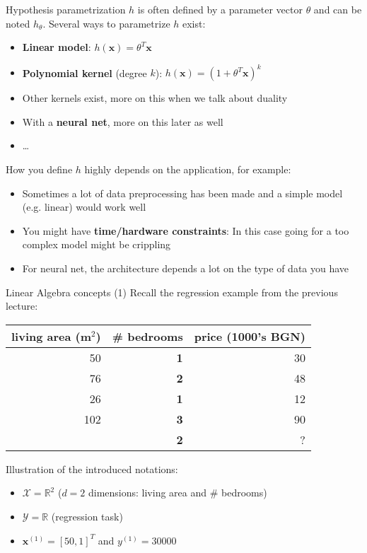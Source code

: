 \documentclass{beamer}
\newcommand{\X}{\mathcal{X}}
\newcommand{\Y}{\mathcal{Y}}
\newcommand{\real}{\mathbb{R}}
\newcommand{\bx}{\bm{x}}
\begin{document}
\begin{frame}{Hypothesis parametrization}
$h$ is often defined by a parameter vector $\theta$ and can be noted $h_\theta$. \pause Several ways to parametrize $h$ exist:
\begin{itemize}
	\item \textbf{Linear model}: $h(\bx) = \theta^T \bx$
	\item \textbf{Polynomial kernel} (degree $k$): $h(\bx) = \left(1 + \theta^T \bx\right)^k$
	\item Other kernels exist, more on this when we talk about duality
	\item With a \textbf{neural net}, more on this later as well
	\item \ldots
\end{itemize}
\vfill
\pause
How you define $h$ highly depends on the application, for example:
\begin{itemize}
	\item Sometimes a lot of data preprocessing has been made and a simple model (e.g. linear) would work well
	\item You might have \textbf{time/hardware constraints}: In this case going for a too complex model might be crippling
	\item For neural net, the architecture depends a lot on the type of data you have
\end{itemize}
\end{frame}


\begin{frame}{Linear Algebra concepts (1)}
Recall the regression example from the previous lecture:
\pause
\vfill
\begin{table}
\centering
\begin{tabular}{r|r|r}
living area (m$^2$) &  \textbf{\# bedrooms} & price (1000's BGN) \\\hline
50 & \textbf{1} & 30\\
76 & \textbf{2} & 48\\
26 & \textbf{1} & 12\\
102 & \textbf{3} & 90\\
\pause
61 & \textbf{2} & ?
\end{tabular}
\end{table}
\vfill
\pause
Illustration of the introduced notations:
\begin{itemize}
	\item $\X = \real^2$ ($d = 2$ dimensions: living area and  \# bedrooms)
	\item $\Y = \real$ (regression task)
	\item $\bx^{(1)} = \left[ 50, 1 \right]^T$ and $y^{(1)} = 30000$
\end{itemize}
\end{frame}
\end{document}
